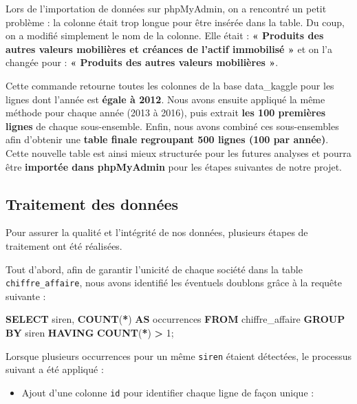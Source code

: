 \documentclass[mstat,12pt]{unswthesis}
\newenvironment{Shaded}{\begin{snugshade}}{\end{snugshade}}
\newcommand{\DecValTok}[1]{\textcolor[rgb]{0.00,0.00,0.81}{#1}}
\newcommand{\FunctionTok}[1]{\textcolor[rgb]{0.13,0.29,0.53}{\textbf{#1}}}
\newcommand{\KeywordTok}[1]{\textcolor[rgb]{0.13,0.29,0.53}{\textbf{#1}}}
\newcommand{\NormalTok}[1]{#1}
\newcommand{\OperatorTok}[1]{\textcolor[rgb]{0.81,0.36,0.00}{\textbf{#1}}}
\begin{document}
\medskip

Lors de l'importation de données sur phpMyAdmin, on a rencontré un petit
problème : la colonne était trop longue pour être insérée dans la table.
Du coup, on a modifié simplement le nom de la colonne. Elle était :
\textbf{« Produits des autres valeurs mobilières et créances de l'actif
immobilisé » } et on l'a changée pour : \textbf{« Produits des autres
valeurs mobilières »}.

\medskip

Cette commande retourne toutes les colonnes de la base data\_kaggle pour
les lignes dont l'année est \textbf{égale à 2012}. Nous avons ensuite
appliqué la même méthode pour chaque année (2013 à 2016), puis extrait
\textbf{les 100 premières lignes} de chaque sous-ensemble. Enfin, nous
avons combiné ces sous-ensembles afin d'obtenir une \textbf{table finale
regroupant 500 lignes (100 par année)}. Cette nouvelle table est ainsi
mieux structurée pour les futures analyses et pourra être
\textbf{importée dans phpMyAdmin} pour les étapes suivantes de notre
projet.

\subsection{Traitement des données}\label{traitement-des-donnuxe9es}

Pour assurer la qualité et l'intégrité de nos données, plusieurs étapes
de traitement ont été réalisées.

Tout d'abord, afin de garantir l'unicité de chaque société dans la table
\texttt{chiffre\_affaire}, nous avons identifié les éventuels doublons
grâce à la requête suivante :

\begin{Shaded}
\begin{Highlighting}[]
\KeywordTok{SELECT}\NormalTok{ siren, }\FunctionTok{COUNT}\NormalTok{(}\OperatorTok{*}\NormalTok{) }\KeywordTok{AS}\NormalTok{ occurrences}
\KeywordTok{FROM}\NormalTok{ chiffre\_affaire}
\KeywordTok{GROUP} \KeywordTok{BY}\NormalTok{ siren}
\KeywordTok{HAVING} \FunctionTok{COUNT}\NormalTok{(}\OperatorTok{*}\NormalTok{) }\OperatorTok{\textgreater{}} \DecValTok{1}\NormalTok{;}
\end{Highlighting}
\end{Shaded}

Lorsque plusieurs occurrences pour un même \texttt{siren} étaient
détectées, le processus suivant a été appliqué :

\begin{itemize}
\tightlist
\item
  Ajout d'une colonne \texttt{id} pour identifier chaque ligne de façon
  unique :
\end{itemize}
\end{document}
